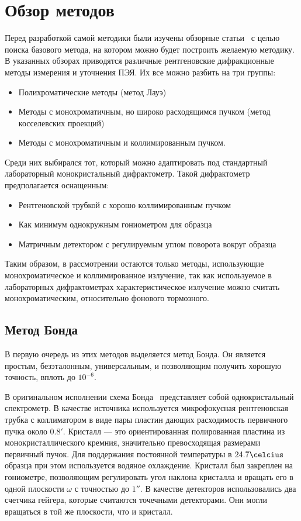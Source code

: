 \section{Обзор методов}

Перед разработкой самой методики были изучены обзорные статьи~\cite{Lider:2020,Galdecka:2006} с целью поиска базового метода, на котором можно будет построить желаемую методику.
В указанных обзорах приводятся различные рентгеновские дифракционные методы измерения и уточнения ПЭЯ.
Их все можно разбить на три группы:
\begin{itemize}
    \item Полихроматические методы (метод Лауэ)
    \item Методы с монохроматичным, но широко расходящимся пучком (метод косселевских проекций)
    \item Методы с монохроматичным и коллимированным пучком.
\end{itemize}
Среди них выбирался тот, который можно адаптировать под стандартный лабораторный монокристальный дифрактометр.
Такой дифрактометр предполагается оснащенным:
\begin{itemize}
    \item Рентгеновской трубкой с хорошо коллимированным пучком
    \item Как минимум однокружным гониометром для образца
    \item Матричным детектором с регулируемым углом поворота вокруг образца
\end{itemize}
Таким образом, в рассмотрении остаются только методы, использующие монохроматическое и коллимированное излучение, так как используемое в лабораторных дифрактометрах характеристическое излучение можно считать монохроматическим, относительно фонового тормозного.

\subsection{Метод Бонда}

В первую очередь из этих методов выделяется метод Бонда.
Он является простым, безэталонным, универсальным, и позволяющим получить хорошую точность, вплоть до $10^{-6}$.

В оригинальном исполнении схема Бонда~\cite{Bond:1960} представляет собой однокристальный спектрометр.
В качестве источника используется микрофокусная рентгеновская трубка с коллиматором в виде пары пластин дающих расходимость первичного пучка около $0.8'$.
Кристалл --- это ориентированная полированная пластина из монокристаллического кремния, значительно превосходящая размерами первичный пучок.
Для поддержания постоянной температуры в $24.7\celcius$ образца при этом используется водяное охлаждение.
Кристалл был закреплен на гониометре, позволяющим регулировать угол наклона кристалла и вращать его в одной плоскости $\omega$ с точностью до $1''$.
В качестве детекторов использовались два счетчика гейгера, которые считаются точечными детекторами.
Они могли вращаться в той же плоскости, что и кристалл.

